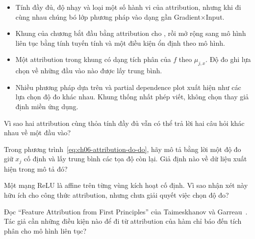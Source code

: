 \begin{tomtat}
\begin{itemize}
  \item Tính đầy đủ, độ nhạy và  loại một số hành
  vi của attribution, nhưng khi đi cùng nhau chúng bó lớp phương pháp vào dạng
  gần Gradient$\mathbin{\times}$Input.
  \item Khung của chương bắt đầu bằng attribution cho , rồi mở rộng
  sang mô hình liên tục bằng tính tuyến tính và một điều kiện ổn định theo mô
  hình.
  \item Một attribution trong khung có dạng tích phân của $f$ theo
   $\mu_{j,x}$. Độ đo ghi lựa chọn về những đầu vào nào được lấy trung bình.
  \item Nhiều phương pháp dựa trên  và
  partial dependence plot
  xuất hiện như các lựa chọn độ đo khác nhau. Khung thống nhất phép viết, không
  chọn thay giả định miền ứng dụng.
\end{itemize}
\end{tomtat}

\cauhoi
\begin{cauhoids}
  \item Vì sao hai attribution cùng thỏa tính đầy đủ vẫn có thể trả lời hai
  câu hỏi khác nhau về một đầu vào?
  \item Trong phương trình~\ref{eq:ch06-attribution-do-do}, hãy mô tả bằng lời
  một độ đo giữ $x_j$ cố định và lấy trung bình các tọa độ còn lại. Giả định
  nào về dữ liệu xuất hiện trong mô tả đó?
  \item Một mạng ReLU là affine trên từng vùng kích hoạt cố định. Vì sao nhận
  xét này hữu ích cho công thức attribution, nhưng chưa giải quyết việc chọn
  độ đo?
  \item Đọc \enquote{Feature Attribution from First Principles} của
  Taimeskhanov và Garreau~\autocite{p17firstprinciples}. Tác giả cần những điều
  kiện nào để đi từ attribution của hàm chỉ báo đến tích phân cho mô hình liên
  tục?
\end{cauhoids}
